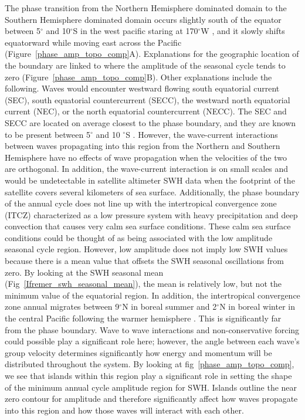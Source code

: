 \documentclass[12pt,twoside]{article}
\begin{document}
The phase transition from the Northern Hemisphere dominated domain to the Southern Hemisphere dominated domain occurs slightly south of the equator between 5$^{\circ}$ and 10$^{\circ}$S in the west pacific staring at 170$^{\circ}$W , and it slowly shifts equatorward while moving east across the Pacific (Figure~\ref{phase_amp_topo_comp}A). Explanations for the geographic location of the boundary are linked to where the amplitude of the seasonal cycle tends to zero (Figure~\ref{phase_amp_topo_comp}B). Other explanations include the following. Waves would encounter westward flowing south equatorial current (SEC), south equatorial countercurrent (SECC), the westward north equatorial current (NEC), or the north equatorial countercurrent (NECC). The SEC and SECC are located on average closest to the phase boundary, and they are known to be present between 5$^{\circ}$ and 10 $^{\circ}$S \cite{talley2011descriptive}. However, the wave-current interactions between waves propagating into this region from the Northern and Southern Hemisphere have no effects of wave propagation when the velocities of the two are orthogonal. In addition, the wave-current interaction is on small scales and would be undetectable in satellite altimeter SWH data when the footprint of the satellite covers several kilometers of sea surface. Additionally, the phase boundary of the annual cycle does not line up with the intertropical convergence zone (ITCZ) characterized as a low pressure system with heavy precipitation and deep convection \cite{schneider2014migrations} that causes very calm sea surface conditions. These calm sea surface conditions could be thought of as being associated with the low amplitude seasonal cycle region. However, low amplitude does not imply low SWH values because there is a mean value that offsets the SWH seasonal oscillations from zero. By looking at the SWH seasonal mean (Fig~\ref{Ifremer_swh_seasonal_mean}), the mean is relatively low, but not the minimum value of the equatorial region. In addition, the intertropical convergence zone annual migrates between 9$^{\circ}$N in boreal summer and 2$^{\circ}$N in boreal winter in the central Pacific following the warmer hemisphere \cite{schneider2014migrations}. This is significantly far from the phase boundary. Wave to wave interactions and non-conservative forcing could possible play a significant role here; however, the angle between each wave's group velocity determines significantly how energy and momentum will be distributed throughout the system. By looking at fig~\ref{phase_amp_topo_comp}, we see that islands within this region play a significant role in setting the shape of the minimum annual cycle amplitude region for SWH. Islands outline the near zero contour for amplitude and therefore significantly affect how waves propagate into this region and how those waves will interact with each other. 
\end{document}
